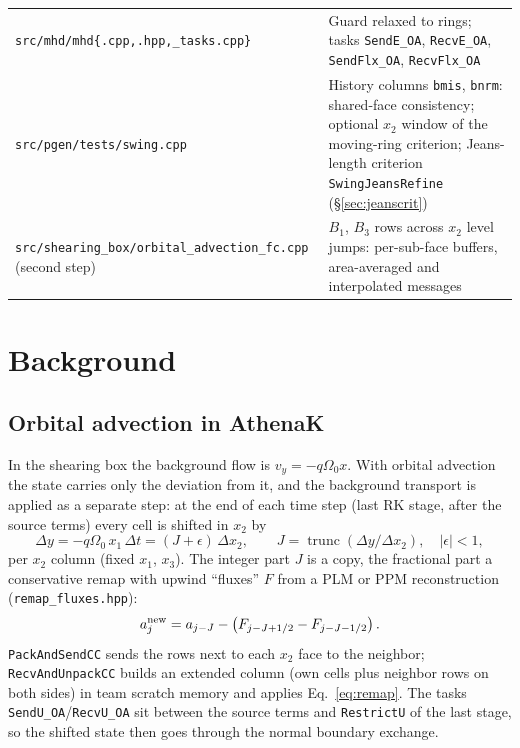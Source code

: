\documentclass[11pt]{article}
\newcommand{\code}[1]{\texttt{#1}}
\newcommand{\file}[1]{\texttt{\small #1}}
\newcommand{\fn}[1]{\texttt{\small #1}}
\newcommand{\Om}{\Omega_0}
\newcommand{\qom}{q\Om}
\begin{document}
\begin{center}
\begin{tabular}{@{}>{\raggedright\arraybackslash}p{5.2cm}p{9.2cm}@{}}
\file{src/mhd/mhd\{.cpp,.hpp,\_tasks.cpp\}} & Guard relaxed to rings; tasks
\fn{SendE\_OA}, \fn{RecvE\_OA}, \fn{SendFlx\_OA}, \fn{RecvFlx\_OA} \\
\file{src/pgen/tests/swing.cpp} & History columns \code{bmis}, \code{bnrm}: shared-face
consistency; optional $x_2$ window of the moving-ring criterion; Jeans-length
criterion \fn{SwingJeansRefine} (\S\ref{sec:jeanscrit}) \\
\file{src/shearing\_box/orbital\_advection\_fc.cpp} (second step) & $B_1$, $B_3$ rows across
$x_2$ level jumps: per-sub-face buffers, area-averaged and interpolated messages \\
\bottomrule
\end{tabular}
\end{center}

\section{Background}
\label{sec:background}

\subsection{Orbital advection in AthenaK}
In the shearing box the background flow is $v_y = -\qom x$. With orbital advection the
state carries only the deviation from it, and the background transport is applied as a
separate step: at the end of each time step (last RK stage, after the source terms) every
cell is shifted in $x_2$ by
\begin{equation}
  \Delta y = -\qom\, x_1\, \Delta t = (J + \epsilon)\,\Delta x_2,
  \qquad J = \operatorname{trunc}(\Delta y/\Delta x_2),\quad |\epsilon| < 1,
\end{equation}
per $x_2$ column (fixed $x_1$, $x_3$). The integer part $J$ is a copy, the fractional part a
conservative remap with upwind ``fluxes'' $F$ from a PLM or PPM reconstruction
(\file{remap\_fluxes.hpp}):
\begin{equation}
  a^{\rm new}_j = a_{j-J} - \left(F_{j-J+1/2} - F_{j-J-1/2}\right).
  \label{eq:remap}
\end{equation}
\fn{PackAndSendCC} sends the rows next to each $x_2$ face to the neighbor;
\fn{RecvAndUnpackCC} builds an extended column (own cells plus neighbor rows on both
sides) in team scratch memory and applies Eq.~\eqref{eq:remap}. The tasks
\fn{SendU\_OA}/\fn{RecvU\_OA} sit between the source terms and \fn{RestrictU} of the last
stage, so the shifted state then goes through the normal boundary exchange.
\end{document}
